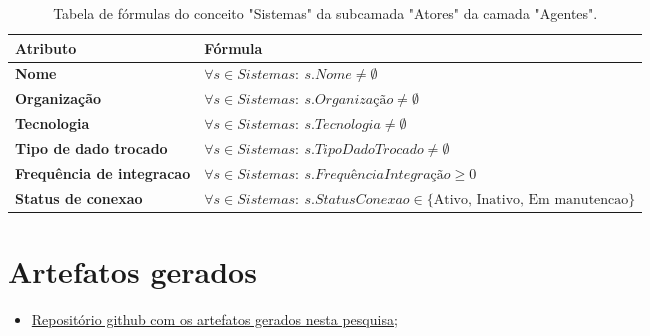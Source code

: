 \begin{apendicesenv}
\begin{table}[H]
\centering
\caption{Tabela de fórmulas do conceito "Sistemas" da subcamada "Atores" da camada "Agentes".}
\begin{tabularx}{\textwidth}{|l|X|}
\hline
\textbf{Atributo} & \textbf{Fórmula} \\ \hline
\textbf{Nome} & $\forall s \in Sistemas:\ s.Nome \neq \emptyset$ \\ \hline
\textbf{Organização} & $\forall s \in Sistemas:\ s.Organização \neq \emptyset$ \\ \hline
\textbf{Tecnologia} & $\forall s \in Sistemas:\ s.Tecnologia \neq \emptyset$ \\ \hline
\textbf{Tipo de dado trocado} & $\forall s \in Sistemas:\ s.TipoDadoTrocado \neq \emptyset$ \\ \hline
\textbf{Frequência de integracao} & $\forall s \in Sistemas:\ s.FrequênciaIntegração \ge 0$ \\ \hline
\textbf{Status de conexao} & $\forall s \in Sistemas:\ s.StatusConexao \in \{\text{Ativo, Inativo, Em manutencao}\}$ \\ \hline
\end{tabularx}
\end{table}



\chapter{Artefatos gerados}

\begin{itemize}
    \item \href{https://github.com/kvojps/onto-mpo}{Repositório github com os artefatos gerados nesta pesquisa;}
\end{itemize}

\end{apendicesenv}
